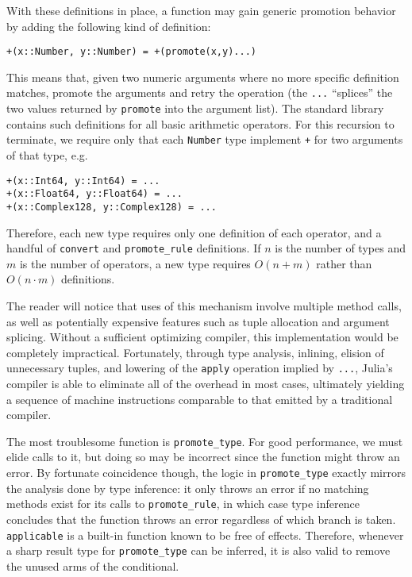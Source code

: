 \documentclass[9pt]{sigplanconf}
\begin{document}
With these definitions in place, a function may gain generic promotion
behavior by adding the following kind of definition:

\begin{verbatim}
+(x::Number, y::Number) = +(promote(x,y)...)
\end{verbatim}

This means that, given two numeric arguments where no more specific
definition matches, promote the arguments and retry the operation
(the {\tt ...} ``splices'' the two values returned by {\tt promote} into
the argument list).
The standard library contains such definitions for all basic arithmetic
operators.
For this recursion to terminate, we require only that each {\tt Number}
type implement {\tt +} for two arguments of that type, e.g.

\begin{verbatim}
+(x::Int64, y::Int64) = ...
+(x::Float64, y::Float64) = ...
+(x::Complex128, y::Complex128) = ...
\end{verbatim}

Therefore, each new type requires only one definition of each operator,
and a handful of {\tt convert} and {\tt promote\_rule} definitions.
If $n$ is the number of types and $m$ is the number of operators, a new
type requires $O(n+m)$ rather than $O(n\cdot m)$ definitions.

The reader will notice that uses of this mechanism involve multiple method
calls, as well as potentially expensive features such as tuple allocation
and argument splicing. Without a sufficient optimizing compiler, this
implementation would be completely impractical. Fortunately, through
type analysis, inlining, elision of unnecessary tuples, and lowering of
the {\tt apply} operation implied by {\tt ...}, Julia's compiler is able
to eliminate all of the overhead in most cases, ultimately yielding a
sequence of machine instructions comparable to that emitted by a
traditional compiler.

The most troublesome function is {\tt promote\_type}. For good performance,
we must elide calls to it, but doing so may be incorrect since the function
might throw an error. By fortunate coincidence though, the logic in
{\tt promote\_type} exactly mirrors the analysis done by type inference: it
only throws an error if no matching methods exist for its calls to
{\tt promote\_rule}, in which case type inference concludes that the
function throws an error regardless of which branch is taken.
{\tt applicable} is a built-in function known to be free of effects.
Therefore, whenever a sharp result type for {\tt promote\_type} can be
inferred, it is also valid to remove the unused arms of the conditional.
\end{document}
